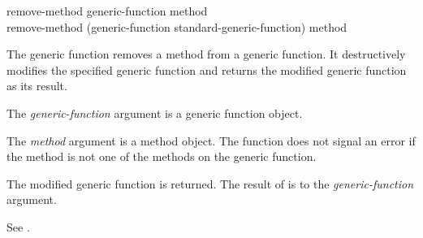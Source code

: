 \begin{defun}
remove-method generic-function method \\
remove-method (generic-function standard-generic-function) method

The generic function  removes a method from a
generic function.  It destructively modifies the specified generic
function and returns the modified generic function as its result.

The \emph{generic-function} argument is a generic function
object.

The \emph{method} argument is a method object.  The function 
 does not signal an error if the method is not one of the
methods on the generic function.

The modified generic function is returned.  The result of  
is  to the \emph{generic-function} argument.

See .
\end{defun}

